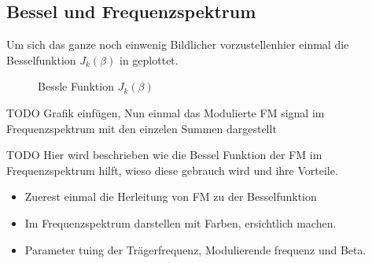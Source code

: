 \subsection{Bessel und Frequenzspektrum}
Um sich das ganze noch einwenig Bildlicher vorzustellenhier einmal die Besselfunktion \(J_{k}(\beta)\) in geplottet.
\begin{figure}
	\centering
	
	\caption{Bessle Funktion \(J_{k}(\beta)\)}
	\label{fig:bessel}
\end{figure}
TODO Grafik einfügen,
\newline
Nun einmal das Modulierte FM signal im Frequenzspektrum mit den einzelen Summen dargestellt

TODO
Hier wird beschrieben wie die Bessel Funktion der FM im Frequenzspektrum hilft, wieso diese gebrauch wird und ihre Vorteile.
\begin{itemize}
    \item Zuerest einmal die Herleitung von FM zu der Besselfunktion
    \item Im Frequenzspektrum darstellen mit Farben, ersichtlich machen. 
    \item Parameter tuing der Trägerfrequenz, Modulierende frequenz und Beta. 
\end{itemize}





